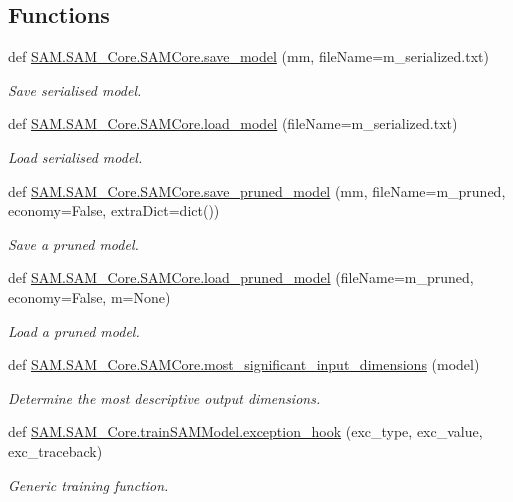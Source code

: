 \subsection*{Functions}
\begin{DoxyCompactItemize}
\item 
def \hyperlink{group__icubclient__SAM__Core_ga9ce969892128bc69c859146c6ba19b47}{S\+A\+M.\+S\+A\+M\+\_\+\+Core.\+S\+A\+M\+Core.\+save\+\_\+model} (mm, file\+Name=\textquotesingle{}m\+\_\+serialized.\+txt\textquotesingle{})
\begin{DoxyCompactList}\small\item\em Save serialised model. \end{DoxyCompactList}\item 
def \hyperlink{group__icubclient__SAM__Core_gaccf785120f296a32b2b811e80b9bf455}{S\+A\+M.\+S\+A\+M\+\_\+\+Core.\+S\+A\+M\+Core.\+load\+\_\+model} (file\+Name=\textquotesingle{}m\+\_\+serialized.\+txt\textquotesingle{})
\begin{DoxyCompactList}\small\item\em Load serialised model. \end{DoxyCompactList}\item 
def \hyperlink{group__icubclient__SAM__Core_gae32d9cee31703fea1899ee5cc876e949}{S\+A\+M.\+S\+A\+M\+\_\+\+Core.\+S\+A\+M\+Core.\+save\+\_\+pruned\+\_\+model} (mm, file\+Name=\textquotesingle{}m\+\_\+pruned\textquotesingle{}, economy=False, extra\+Dict=dict())
\begin{DoxyCompactList}\small\item\em Save a pruned model. \end{DoxyCompactList}\item 
def \hyperlink{group__icubclient__SAM__Core_ga4ee9fba2f044889dbaff106b25dacd69}{S\+A\+M.\+S\+A\+M\+\_\+\+Core.\+S\+A\+M\+Core.\+load\+\_\+pruned\+\_\+model} (file\+Name=\textquotesingle{}m\+\_\+pruned\textquotesingle{}, economy=False, m=None)
\begin{DoxyCompactList}\small\item\em Load a pruned model. \end{DoxyCompactList}\item 
def \hyperlink{group__icubclient__SAM__Core_ga28b70c1cda2c0787dd3728b4e39a55a1}{S\+A\+M.\+S\+A\+M\+\_\+\+Core.\+S\+A\+M\+Core.\+most\+\_\+significant\+\_\+input\+\_\+dimensions} (model)
\begin{DoxyCompactList}\small\item\em Determine the most descriptive output dimensions. \end{DoxyCompactList}\end{DoxyCompactItemize}
\begin{DoxyCompactItemize}
\item 
def \hyperlink{group__icubclient__SAM__Core_gab9063d062c168b9c621a28ab469ae1f9}{S\+A\+M.\+S\+A\+M\+\_\+\+Core.\+train\+S\+A\+M\+Model.\+exception\+\_\+hook} (exc\+\_\+type, exc\+\_\+value, exc\+\_\+traceback)
\begin{DoxyCompactList}\small\item\em Generic training function. \end{DoxyCompactList}\end{DoxyCompactItemize}


